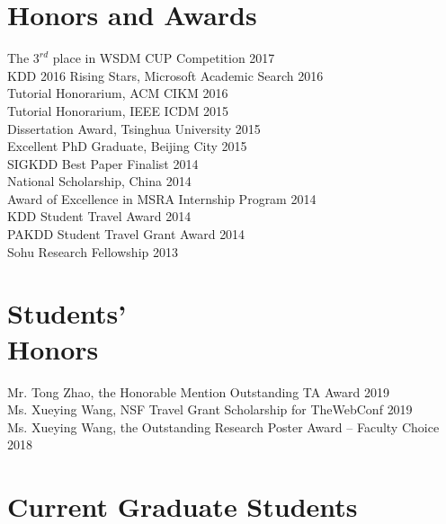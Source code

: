 \documentclass[margin, 9pt]{res}
\begin{document}
\begin{resume}

\section{Honors and Awards}

{The $3^{rd}$ place in WSDM CUP Competition} \hfill{2017} \\
{KDD 2016 Rising Stars, Microsoft Academic Search} \hfill{2016} \\
{Tutorial Honorarium, ACM CIKM} \hfill{2016} \\
{Tutorial Honorarium, IEEE ICDM} \hfill{2015} \\
{Dissertation Award, Tsinghua University} \hfill{2015} \\
{Excellent PhD Graduate, Beijing City} \hfill{2015} \\
{SIGKDD Best Paper Finalist} \hfill{2014} \\
{National Scholarship, China} \hfill{2014} \\
{Award of Excellence in MSRA Internship Program} \hfill{2014} \\
{KDD Student Travel Award} \hfill{2014} \\
{PAKDD Student Travel Grant Award} \hfill{2014} \\
{Sohu Research Fellowship} \hfill{2013}

\section{Students' \\ Honors}

{Mr. Tong Zhao, the Honorable Mention Outstanding TA Award} \hfill{2019} \\
{Ms. Xueying Wang, NSF Travel Grant Scholarship for TheWebConf} \hfill{2019} \\
{Ms. Xueying Wang, the Outstanding Research Poster Award -- Faculty Choice} \hfill{2018}


\section{Current Graduate Students}


\end{resume}
\end{document}
